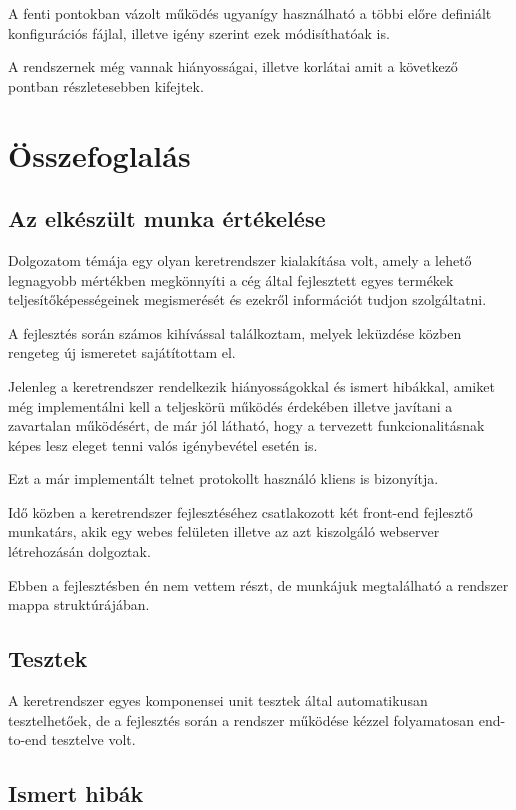 \documentclass[a4paper,12pt,oneside]{report}
\begin{document}
A fenti pontokban vázolt működés ugyanígy használható a többi előre definiált konfigurációs fájlal, illetve igény szerint ezek módisíthatóak is.

A rendszernek még vannak hiányosságai, illetve korlátai amit a következő pontban részletesebben kifejtek.

\section{Összefoglalás}
\subsection{Az elkészült munka értékelése}

Dolgozatom témája egy olyan keretrendszer kialakítása volt, amely a lehető legnagyobb mértékben megkönnyíti a cég által fejlesztett egyes termékek teljesítőképességeinek megismerését és ezekről információt tudjon szolgáltatni.

A fejlesztés során számos kihívással találkoztam, melyek leküzdése közben rengeteg új ismeretet sajátítottam el.

Jelenleg a keretrendszer rendelkezik hiányosságokkal és ismert hibákkal, amiket még implementálni kell a teljeskörü működés érdekében illetve javítani a zavartalan működésért, de már jól látható, hogy a tervezett funkcionalitásnak képes lesz eleget tenni valós igénybevétel esetén is.

Ezt a már implementált telnet protokollt használó kliens is bizonyítja.

Idő közben a keretrendszer fejlesztéséhez csatlakozott két front-end fejlesztő munkatárs, akik egy webes felületen illetve az azt kiszolgáló webserver létrehozásán dolgoztak.

Ebben a fejlesztésben én nem vettem részt, de munkájuk megtalálható a rendszer mappa struktúrájában.

\subsection{Tesztek}

A keretrendszer egyes komponensei unit tesztek által automatikusan tesztelhetőek, de a fejlesztés során a rendszer működése kézzel folyamatosan end-to-end\cite{website:end2end} tesztelve volt.


\subsection{Ismert hibák}
\end{document}
